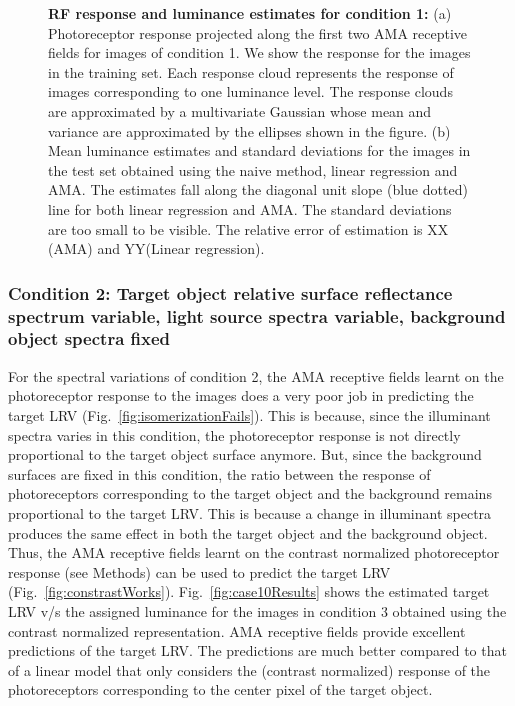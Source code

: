 \documentclass{jov}
\begin{document}
\begin{figure}
\begin{subfigure}[b]{0.3 \textwidth}
        \label{fig:case1Results}
    \end{subfigure}    
    \caption{{\bf RF response and luminance estimates for condition 1:} (a) Photoreceptor response projected along the first two AMA receptive fields for images of condition 1. We show the response for the images in the training set. Each response cloud represents the response of images corresponding to one luminance level. The response clouds are approximated by a multivariate Gaussian whose mean and variance are approximated by the ellipses shown in the figure. (b) Mean luminance estimates and standard deviations for the images in the test set obtained using the naive method, linear regression and AMA. The estimates fall along the diagonal unit slope (blue dotted) line for both linear regression and AMA. The standard deviations are too small to be visible. The relative error of estimation is XX (AMA) and YY(Linear regression).}
\label{fig:Condition1}
\end{figure}

\subsubsection{Condition 2: Target object relative surface reflectance spectrum variable, light source spectra variable, background object spectra fixed}
For the spectral variations of condition 2, the AMA receptive fields learnt on the photoreceptor response to the images does a very poor job in predicting the target LRV (Fig.~\ref{fig:isomerizationFails}). 
This is because, since the illuminant spectra varies in this condition, the photoreceptor response is not directly proportional to the target object surface anymore. 
But, since the background surfaces are fixed in this condition, the ratio between the response of  photoreceptors corresponding to the target object and the background remains proportional to the target LRV. 
This is because a change in illuminant spectra produces the same effect in both the target object and the background object. 
Thus, the AMA receptive fields learnt on the contrast normalized photoreceptor response (see Methods) can be used to predict the target LRV (Fig.~\ref{fig:constrastWorks}). 
Fig.~\ref{fig:case10Results} shows the estimated target LRV v/s the assigned luminance for the images in condition 3 obtained using the contrast normalized representation. 
AMA receptive fields provide excellent predictions of the target LRV. 
The predictions are much better compared to that of a linear model that only considers the (contrast normalized) response of the photoreceptors corresponding to the center pixel of the target object.
\end{document}
